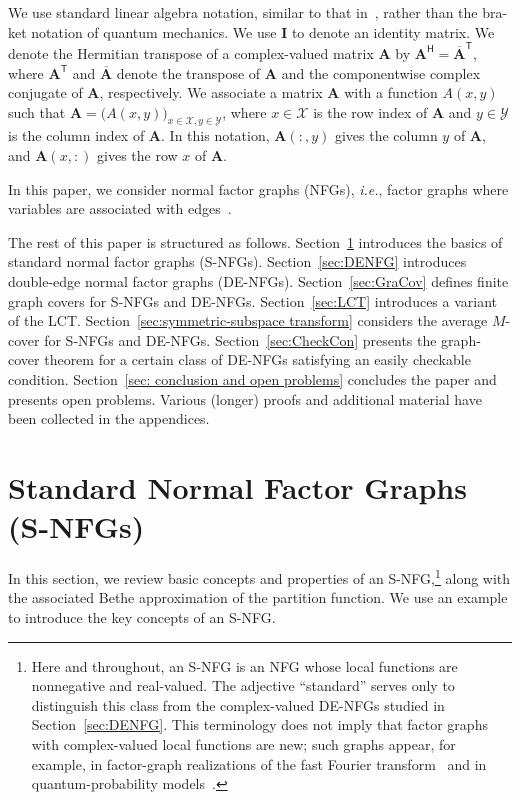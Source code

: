 \documentclass[journal]{IEEEtran}
\newcommand{\add}[1]{{\color{black}#1}}
\newcommand{\vect}[1]{ \bm{#1} }
\newcommand{\set}[1]{\mathcal{#1}}
\newcommand{\Herm}{\mathsf{H}}
\newcommand{\tran}{\mathsf{T}}
\newcommand{\matr}[1]{\vect{#1}}
\newcommand*{\ie}{\textit{i.e.}}
\begin{document}
\add{We use standard linear algebra notation, similar to that
  in~\cite{Loeliger2017,Loeliger2020}, rather than the bra-ket notation of
  quantum mechanics.} We use $\matr{I}$ to denote an identity matrix. We
denote the Hermitian transpose of a complex-valued matrix $\matr{A}$ by
$\matr{A}^{\Herm} = \overline{\matr{A}}^{\tran}$, where $\matr{A}^{\tran}$ and
$\overline{\matr{A}}$ denote the transpose of $\matr{A}$ and the componentwise
complex conjugate of $\matr{A}$, respectively. We associate a matrix
$\matr{A}$ with a function $A(x, y)$ such that
$ \matr{A} = \bigl( A(x, y) \bigr)_{ \! x \in \set{X}, y \in \set{Y} } $,
where $x \in \set{X}$ is the row index of $\matr{A}$ and $y \in \set{Y}$ is
the column index of $\matr{A}$. In this notation, $\matr{A}(:, y)$ gives the
column $y$ of $\matr{A}$, and $\matr{A}(x, :)$ gives the row $x$ of
$\matr{A}$.

In this paper, we consider normal factor graphs (NFGs), \ie, factor graphs
where variables are associated with edges~\cite{Kschischang2001,Loeliger2004}.

\add{The rest of this paper is structured as follows. Section~\ref{sec:SNFG}
  introduces the basics of standard normal factor graphs (S-NFGs).
  Section~\ref{sec:DENFG} introduces double-edge normal factor graphs
  (DE-NFGs). Section~\ref{sec:GraCov} defines finite graph covers for S-NFGs
  and DE-NFGs. Section~\ref{sec:LCT} introduces a variant of the
  LCT. Section~\ref{sec:symmetric-subspace transform} considers the average
  $M$-cover for S-NFGs and DE-NFGs. Section~\ref{sec:CheckCon} presents the
  graph-cover theorem for a certain class of DE-NFGs satisfying an easily
  checkable condition.  Section~\ref{sec: conclusion and open problems}
  concludes the paper and presents open problems.  Various (longer) proofs and
  additional material have been collected in the appendices.}

\section{Standard Normal Factor Graphs (S-NFGs)}
\label{sec:SNFG}

In this section, we review basic concepts and properties of an
S-NFG,\footnote{\add{Here and throughout, an S-NFG is an NFG whose local
    functions are nonnegative and real-valued. The adjective ``standard''
    serves only to distinguish this class from the complex-valued DE-NFGs
    studied in Section~\ref{sec:DENFG}. This terminology does not imply that
    factor graphs with complex-valued local functions are new; such graphs
    appear, for example, in factor-graph realizations of the fast Fourier
    transform~\cite{Kschischang2001} and in quantum-probability
    models~\cite{Loeliger2017,Loeliger2020}.}} along with the associated Bethe
approximation of the partition function.  We use an example to introduce the
key concepts of an S-NFG.
\end{document}
